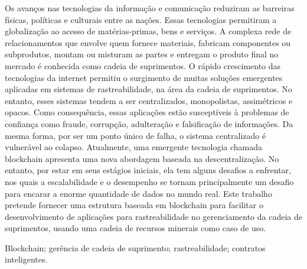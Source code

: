 
\resumo
Os avanços nas tecnologias da informação e comunicação reduziram as barreiras físicas, políticas e culturais entre as nações. Essas tecnologias permitiram a globalização ao acesso de matérias-primas, bens e serviços. A complexa rede de relacionamentos que envolve quem fornece materiais, fabricam componentes ou subprodutos, montam ou misturam as partes e entregam o produto final no mercado é conhecida como cadeia de suprimentos. O rápido crescimento das tecnologias da internet permitiu o surgimento de muitas soluções emergentes aplicadas em sistemas de rastreabilidade, na área da cadeia de suprimentos. No entanto, esses sistemas tendem a ser centralizados, monopolistas, assimétricos e opacos. Como consequência, essas aplicações estão susceptíveis à problemas de confiança como fraude, corrupção, adulteração e falsificação de informações. Da mesma forma, por ser um ponto único de falha, o sistema centralizado é vulnerável ao colapso. Atualmente, uma emergente tecnologia chamada blockchain apresenta uma nova abordagem baseada na descentralização. No entanto, por estar em seus estágios iniciais, ela tem alguns desafios a enfrentar, nos quais a escalabilidade e o desempenho se tornam principalmente um desafio para encarar a enorme quantidade de dados no mundo real. Este trabalho pretende fornecer uma estrutura baseada em blockchain para facilitar o desenvolvimento de aplicações para rastreabilidade no gerenciamento da cadeia de suprimentos, usando uma cadeia de recursos minerais como caso de uso.


\begin{keywords}
Blockchain; gerência de cadeia de suprimento; rastreabilidade; contratos inteligentes.
\end{keywords}



